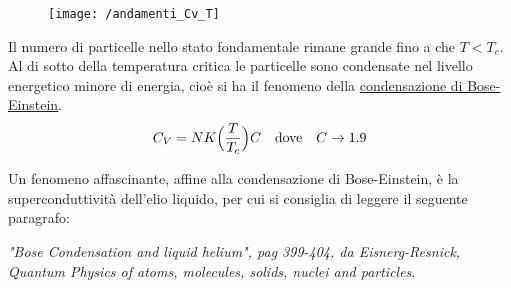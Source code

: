 	\newpage

\begin{figure}[h]
\centering
\texttt{[image: /andamenti\_Cv\_T]}
\end{figure}
Il numero di particelle nello stato fondamentale rimane grande fino a che $T < T_c$.
Al di sotto della temperatura critica le particelle sono condensate nel livello energetico minore di energia, cioè si ha il fenomeno della \underline{condensazione di Bose-Einstein}.
\begin{equation}
C_V = N K \Bigl(  \frac{ T}{T_c }  \Bigr) C \quad \mbox{dove} \quad C \to 1.9
\end{equation} 

Un fenomeno affascinante, affine alla condensazione di Bose-Einstein, è la superconduttività dell'elio liquido, per cui si consiglia di leggere il seguente paragrafo:

\textit{"Bose Condensation and liquid helium", pag 399-404, da Eisnerg-Resnick, Quantum Physics of atoms, molecules, solids, nuclei and particles}.


